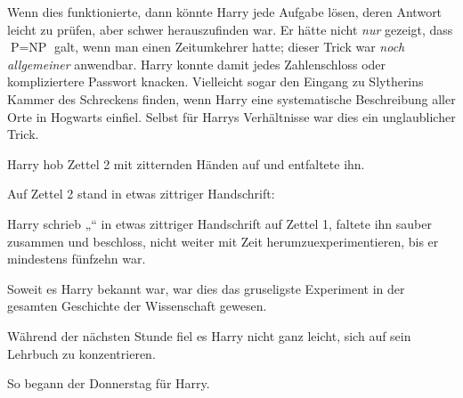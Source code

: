 Wenn dies funktionierte, dann könnte Harry jede Aufgabe lösen, deren Antwort leicht zu prüfen, aber schwer herauszufinden war. Er hätte nicht \emph{nur} gezeigt, dass $\mbox{P}=\mbox{NP}$ galt, wenn man einen Zeitumkehrer hatte; dieser Trick war \emph{noch allgemeiner} anwendbar. Harry konnte damit jedes Zahlenschloss oder kompliziertere Passwort knacken. Vielleicht sogar den Eingang zu Slytherins Kammer des Schreckens finden, wenn Harry eine systematische Beschreibung aller Orte in Hogwarts einfiel. Selbst für Harrys Verhältnisse war dies ein unglaublicher Trick.

Harry hob Zettel 2 mit zitternden Händen auf und entfaltete ihn.

Auf Zettel 2 stand in etwas zittriger Handschrift:


Harry schrieb „“ in etwas zittriger Handschrift auf Zettel 1, faltete ihn sauber zusammen und beschloss, nicht weiter mit Zeit herumzuexperimentieren, bis er mindestens fünfzehn war.

Soweit es Harry bekannt war, war dies das gruseligste Experiment in der gesamten Geschichte der Wissenschaft gewesen.

Während der nächsten Stunde fiel es Harry nicht ganz leicht, sich auf sein Lehrbuch zu konzentrieren.

So begann der Donnerstag für Harry.


